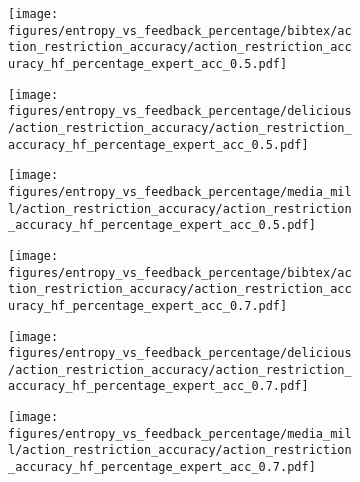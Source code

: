 \begin{figure}[t]
    \begin{subfigure}[b]{0.32\columnwidth}
        \centering
        \texttt{[image: figures/entropy\_vs\_feedback\_percentage/bibtex/action\_restriction\_accuracy/action\_restriction\_accuracy\_hf\_percentage\_expert\_acc\_0.5.pdf]}
    \end{subfigure}
    \hfill
    \begin{subfigure}[b]{0.32\columnwidth}
        \centering
        \texttt{[image: figures/entropy\_vs\_feedback\_percentage/delicious/action\_restriction\_accuracy/action\_restriction\_accuracy\_hf\_percentage\_expert\_acc\_0.5.pdf]}
    \end{subfigure}
    \hfill
    \begin{subfigure}[b]{0.32\columnwidth}
        \centering
        \texttt{[image: figures/entropy\_vs\_feedback\_percentage/media\_mill/action\_restriction\_accuracy/action\_restriction\_accuracy\_hf\_percentage\_expert\_acc\_0.5.pdf]}
    \end{subfigure}
    \hfill

    \begin{subfigure}[b]{0.32\columnwidth}
        \centering
        \texttt{[image: figures/entropy\_vs\_feedback\_percentage/bibtex/action\_restriction\_accuracy/action\_restriction\_accuracy\_hf\_percentage\_expert\_acc\_0.7.pdf]}
    \end{subfigure}
    \hfill
    \begin{subfigure}[b]{0.32\columnwidth}
        \centering
        \texttt{[image: figures/entropy\_vs\_feedback\_percentage/delicious/action\_restriction\_accuracy/action\_restriction\_accuracy\_hf\_percentage\_expert\_acc\_0.7.pdf]}
    \end{subfigure}
    \hfill
    \begin{subfigure}[b]{0.32\columnwidth}
        \centering
        \texttt{[image: figures/entropy\_vs\_feedback\_percentage/media\_mill/action\_restriction\_accuracy/action\_restriction\_accuracy\_hf\_percentage\_expert\_acc\_0.7.pdf]}
    \end{subfigure}
    \hfill


\end{figure}
